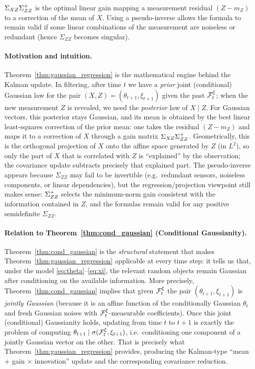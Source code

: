 \begin{remark}[Interpretation]
\(\Sigma_{XZ}\Sigma_{ZZ}^{+}\) is the optimal linear gain mapping a measurement residual \((Z-m_Z)\)
to a correction of the mean of \(X\).
Using a pseudo-inverse allows the formula to remain valid if some linear combinations of the measurement are noiseless
or redundant (hence \(\Sigma_{ZZ}\) becomes singular).
\end{remark}

\paragraph{Motivation and intuition.}
Theorem~\ref{thm:gaussian_regression} is the mathematical engine behind the Kalman update.
In filtering, after time \(t\) we have a \emph{prior} joint (conditional) Gaussian law for the pair
\((X,Z)=(\theta_{t+1},\xi_{t+1})\) given the past \(\mathcal{F}_t^\xi\); when the new measurement \(Z\) is revealed,
we need the \emph{posterior} law of \(X\mid Z\).
For Gaussian vectors, this posterior stays Gaussian, and its mean is obtained by the best linear
least-squares correction of the prior mean: one takes the residual \((Z-m_Z)\) and maps it to a correction of \(X\)
through a gain matrix \( \Sigma_{XZ}\Sigma_{ZZ}^{+} \).
Geometrically, this is the orthogonal projection of \(X\) onto the affine space generated by \(Z\)
(in \(L^2\)), so only the part of \(X\) that is correlated with \(Z\) is ``explained'' by the observation;
the covariance update subtracts precisely that explained part.
The pseudo-inverse appears because \(\Sigma_{ZZ}\) may fail to be invertible (e.g.\ redundant sensors,
noiseless components, or linear dependencies), but the regression/projection viewpoint still makes sense:
\(\Sigma_{ZZ}^{+}\) selects the minimum-norm gain consistent with the information contained in \(Z\),
and the formulas remain valid for any positive semidefinite \(\Sigma_{ZZ}\).

\paragraph{Relation to Theorem~\ref{thm:cond_gaussian} (Conditional Gaussianity).}
Theorem~\ref{thm:cond_gaussian} is the \emph{structural} statement that makes Theorem~\ref{thm:gaussian_regression} applicable at every time step:
it tells us that, under the model \eqref{eq:theta}--\eqref{eq:xi}, the relevant random objects remain Gaussian after conditioning on the
available information. More precisely, Theorem~\ref{thm:cond_gaussian} implies that given \(\mathcal{F}_t^\xi\) the pair
\((\theta_{t+1},\xi_{t+1})\) is \emph{jointly Gaussian} (because it is an affine function of the conditionally Gaussian \(\theta_t\)
and fresh Gaussian noises with \(\mathcal{F}_t^\xi\)-measurable coefficients). Once this joint (conditional) Gaussianity holds,
updating from time \(t\) to \(t+1\) is exactly the problem of computing
\(\theta_{t+1}\mid \sigma(\mathcal{F}_t^\xi,\xi_{t+1})\), i.e.\ conditioning one component of a jointly Gaussian vector on the other.
That is precisely what Theorem~\ref{thm:gaussian_regression} provides, producing the Kalman-type ``mean + gain $\times$ innovation'' update and the corresponding covariance reduction.


